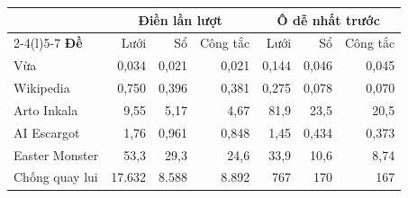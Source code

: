 \begin{tabular}{@{}lrrrrrr@{}}
\toprule
 & \multicolumn{3}{c}{\textbf{Điền lần lượt}} & \multicolumn{3}{c}{\textbf{Ô dễ nhất trước}} \\
\cmidrule(lr){2-4}\cmidrule(l){5-7}
\textbf{Đề} & Lưới & Sổ & Công tắc & Lưới & Sổ & Công tắc \\
\midrule
Vừa & 0,034 & 0,021 & 0,021 & 0,144 & 0,046 & 0,045 \\
Wikipedia & 0,750 & 0,396 & 0,381 & 0,275 & 0,078 & 0,070 \\
Arto Inkala & 9,55 & 5,17 & 4,67 & 81,9 & 23,5 & 20,5 \\
AI Escargot & 1,76 & 0,961 & 0,848 & 1,45 & 0,434 & 0,373 \\
Easter Monster & 53,3 & 29,3 & 24,6 & 33,9 & 10,6 & 8,74 \\
Chống quay lui & 17.632 & 8.588 & 8.892 & 767 & 170 & 167 \\
\bottomrule
\end{tabular}
